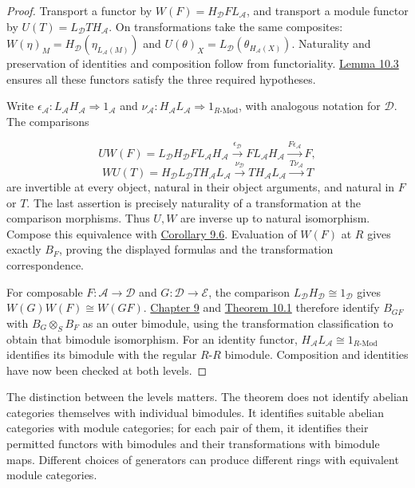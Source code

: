 \documentclass[11pt,a4paper]{article}
\theoremstyle{plain}
\theoremstyle{definition}
\begin{document}
\begin{proof}

Transport a functor by \(W(F)=H_{\mathcal D}F L_{\mathcal A}\), and transport a module functor by \(U(T)=L_{\mathcal D}T H_{\mathcal A}\). On transformations take the same composites: \(W(\eta)_M=H_{\mathcal D}(\eta_{L_{\mathcal A}(M)})\) and \(U(\theta)_X=L_{\mathcal D}(\theta_{H_{\mathcal A}(X)})\). Naturality and preservation of identities and composition follow from functoriality. \hyperref[env-10-3]{Lemma 10.3} ensures all these functors satisfy the three required hypotheses.

 
Write \(\epsilon_{\mathcal A}:L_{\mathcal A}H_{\mathcal A}\Rightarrow1_{\mathcal A}\) and \(\nu_{\mathcal A}:H_{\mathcal A}L_{\mathcal A}\Rightarrow1_{R\text{-Mod}}\), with analogous notation for \(\mathcal D\). The comparisons

 \[UW(F)=L_{\mathcal D}H_{\mathcal D}F L_{\mathcal A}H_{\mathcal A}\xrightarrow{\epsilon_{\mathcal D}}F L_{\mathcal A}H_{\mathcal A}\xrightarrow{F\epsilon_{\mathcal A}}F,\] \[WU(T)=H_{\mathcal D}L_{\mathcal D}T H_{\mathcal A}L_{\mathcal A}\xrightarrow{\nu_{\mathcal D}}T H_{\mathcal A}L_{\mathcal A}\xrightarrow{T\nu_{\mathcal A}}T\] 
are invertible at every object, natural in their object arguments, and natural in \(F\) or \(T\). The last assertion is precisely naturality of a transformation at the comparison morphisms. Thus \(U,W\) are inverse up to natural isomorphism. Compose this equivalence with \hyperref[env-9-6]{Corollary 9.6}. Evaluation of \(W(F)\) at \(R\) gives exactly \(B_F\), proving the displayed formulas and the transformation correspondence.

 
For composable \(F:\mathcal A\to\mathcal D\) and \(G:\mathcal D\to\mathcal E\), the comparison \(L_{\mathcal D}H_{\mathcal D}\cong1_{\mathcal D}\) gives \(W(G)W(F)\cong W(GF)\). \hyperref[chapter-09]{Chapter 9} and \hyperref[env-10-1]{Theorem 10.1} therefore identify \(B_{GF}\) with \(B_G\otimes_SB_F\) as an outer bimodule, using the transformation classification to obtain that bimodule isomorphism. For an identity functor, \(H_{\mathcal A}L_{\mathcal A}\cong1_{R\text{-Mod}}\) identifies its bimodule with the regular \(R\)-\(R\) bimodule. Composition and identities have now been checked at both levels.


\end{proof}
 
The distinction between the levels matters. The theorem does not identify abelian categories themselves with individual bimodules. It identifies suitable abelian categories with module categories; for each pair of them, it identifies their permitted functors with bimodules and their transformations with bimodule maps. Different choices of generators can produce different rings with equivalent module categories.
\end{document}

